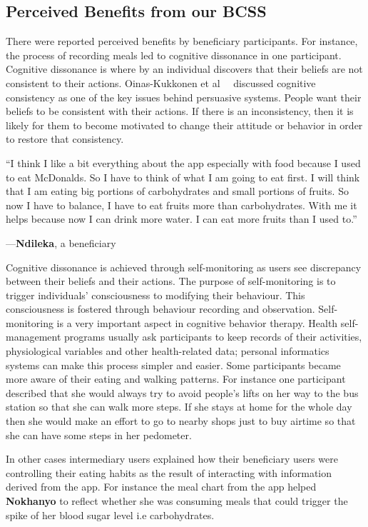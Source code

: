 \documentclass{sig-alternate}
\newenvironment{myquote}
               {\list{}{\rightmargin   \leftmargin
                        \parsep        0in }%
                \item\relax}
               {\endlist}
\newcommand{\userquote}[2]{\begin{samepage}\begin{myquote} 
     \em{\small{#2\begin{flushright}---#1\end{flushright}}}
   \end{myquote}\end{samepage}}
\begin{document}
\subsection{Perceived Benefits from our BCSS}

There were reported perceived benefits by beneficiary participants. For instance, the
process of recording meals led to cognitive dissonance in one participant.
Cognitive dissonance is where by an individual discovers that their beliefs
are not consistent to their actions. Oinas-Kukkonen et 
al~~\cite{Oinas-kukkonen:psd} discussed cognitive consistency as 
one of the key issues behind persuasive systems. People want their beliefs to be consistent with their actions. If there is an inconsistency, then it is likely  for them to become motivated to change their attitude or behavior in order to restore that consistency.  

\userquote{\textbf{Ndileka}, a beneficiary}
{``I think I like a bit everything about the app 
especially with food because I used to eat McDonalds. So I have to think of 
what I am going to eat first. I will think that I am eating big portions of 
carbohydrates and small portions of fruits. So now I have to balance, I 
have to eat fruits more than carbohydrates. With me it helps because now I 
can drink more water. I can eat more fruits than I used to.''}

Cognitive dissonance is achieved through self-monitoring as users see discrepancy between their beliefs and their actions. The purpose of self-monitoring is to trigger
individuals' consciousness to modifying their behaviour. This consciousness is fostered
through behaviour recording and observation. Self-monitoring is a very important aspect in cognitive behavior therapy. Health self-management programs usually ask participants to keep records of their activities, physiological variables and other health-related data; personal informatics systems can make this process simpler and easier. \cite{medynskiy2010salud}
Some participants became more aware of their eating and walking patterns. For instance one participant described that she would always try to avoid people's lifts on her way to the bus station so that she can walk more steps. If she stays at home for the whole day then she would make an effort to go to nearby shops just to buy airtime so that she can have some steps in her pedometer.

In other cases intermediary users explained how their beneficiary users were
controlling their eating habits as the result of interacting with information
derived from the app. For instance the meal chart from the app helped
\textbf{Nokhanyo} to reflect whether she was consuming meals that could
trigger the spike of her blood sugar level i.e carbohydrates.
\end{document}
